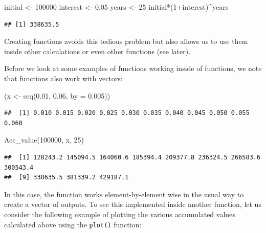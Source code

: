 \documentclass[
]{book}
\newenvironment{Shaded}{\begin{snugshade}}{\end{snugshade}}
\newcommand{\AttributeTok}[1]{\textcolor[rgb]{0.77,0.63,0.00}{#1}}
\newcommand{\DecValTok}[1]{\textcolor[rgb]{0.00,0.00,0.81}{#1}}
\newcommand{\FloatTok}[1]{\textcolor[rgb]{0.00,0.00,0.81}{#1}}
\newcommand{\FunctionTok}[1]{\textcolor[rgb]{0.00,0.00,0.00}{#1}}
\newcommand{\NormalTok}[1]{#1}
\newcommand{\OtherTok}[1]{\textcolor[rgb]{0.56,0.35,0.01}{#1}}
\newcommand{\SpecialCharTok}[1]{\textcolor[rgb]{0.00,0.00,0.00}{#1}}
\theoremstyle{definition}
\theoremstyle{definition}
\theoremstyle{definition}
\theoremstyle{definition}
\theoremstyle{remark}
\begin{document}
\begin{Shaded}
\begin{Highlighting}[]
\NormalTok{initial }\OtherTok{\textless{}{-}} \DecValTok{100000}
\NormalTok{interest }\OtherTok{\textless{}{-}} \FloatTok{0.05}
\NormalTok{years }\OtherTok{\textless{}{-}} \DecValTok{25}
\NormalTok{initial}\SpecialCharTok{*}\NormalTok{(}\DecValTok{1}\SpecialCharTok{+}\NormalTok{interest)}\SpecialCharTok{\^{}}\NormalTok{years}
\end{Highlighting}
\end{Shaded}

\begin{verbatim}
## [1] 338635.5
\end{verbatim}

Creating functions avoids this tedious problem but also allows us to use them inside other calculations or even other functions (see later).

Before we look at some examples of functions working inside of functions, we note that functions also work with vectors:

\begin{Shaded}
\begin{Highlighting}[]
\NormalTok{(x }\OtherTok{\textless{}{-}} \FunctionTok{seq}\NormalTok{(}\FloatTok{0.01}\NormalTok{, }\FloatTok{0.06}\NormalTok{, }\AttributeTok{by =} \FloatTok{0.005}\NormalTok{))}
\end{Highlighting}
\end{Shaded}

\begin{verbatim}
##  [1] 0.010 0.015 0.020 0.025 0.030 0.035 0.040 0.045 0.050 0.055 0.060
\end{verbatim}

\begin{Shaded}
\begin{Highlighting}[]
\FunctionTok{Acc\_value}\NormalTok{(}\DecValTok{100000}\NormalTok{, x, }\DecValTok{25}\NormalTok{)}
\end{Highlighting}
\end{Shaded}

\begin{verbatim}
##  [1] 128243.2 145094.5 164060.6 185394.4 209377.8 236324.5 266583.6 300543.4
##  [9] 338635.5 381339.2 429187.1
\end{verbatim}

In this case, the function works element-by-element wise in the usual way to create a vector of outputs. To see this implemented inside another function, let us consider the following example of plotting the various accumulated values calculated above using the \texttt{plot()} function:
\end{document}

